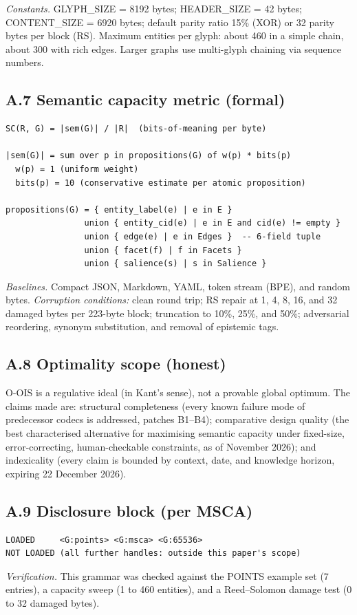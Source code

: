 \textit{Constants.} GLYPH\_SIZE = 8192 bytes; HEADER\_SIZE = 42 bytes; CONTENT\_SIZE = 6920 bytes; default parity ratio 15\% (XOR) or 32 parity bytes per block (RS). Maximum entities per glyph: about 460 in a simple chain, about 300 with rich edges. Larger graphs use multi-glyph chaining via sequence numbers.

\subsection*{A.7 Semantic capacity metric (formal)}

\begin{verbatim}
SC(R, G) = |sem(G)| / |R|  (bits-of-meaning per byte)

|sem(G)| = sum over p in propositions(G) of w(p) * bits(p)
  w(p) = 1 (uniform weight)
  bits(p) = 10 (conservative estimate per atomic proposition)

propositions(G) = { entity_label(e) | e in E }
                union { entity_cid(e) | e in E and cid(e) != empty }
                union { edge(e) | e in Edges }  -- 6-field tuple
                union { facet(f) | f in Facets }
                union { salience(s) | s in Salience }
\end{verbatim}

\textit{Baselines.} Compact JSON, Markdown, YAML, token stream (BPE), and random bytes. \textit{Corruption conditions:} clean round trip; RS repair at 1, 4, 8, 16, and 32 damaged bytes per 223-byte block; truncation to 10\%, 25\%, and 50\%; adversarial reordering, synonym substitution, and removal of epistemic tags.

\subsection*{A.8 Optimality scope (honest)}

O-OIS is a regulative ideal (in Kant's sense), not a provable global optimum. The claims made are: structural completeness (every known failure mode of predecessor codecs is addressed, patches B1--B4); comparative design quality (the best characterised alternative for maximising semantic capacity under fixed-size, error-correcting, human-checkable constraints, as of November 2026); and indexicality (every claim is bounded by context, date, and knowledge horizon, expiring 22 December 2026).

\subsection*{A.9 Disclosure block (per MSCA)}

\begin{verbatim}
LOADED     <G:points> <G:msca> <G:65536>
NOT LOADED (all further handles: outside this paper's scope)
\end{verbatim}

\textit{Verification.} This grammar was checked against the POINTS example set (7 entries), a capacity sweep (1 to 460 entities), and a Reed--Solomon damage test (0 to 32 damaged bytes).

